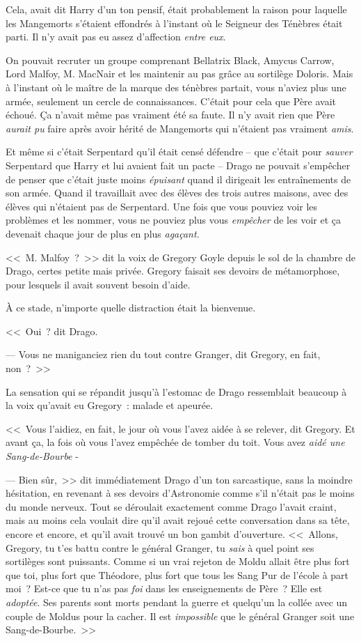 Cela, avait dit Harry d'un ton pensif, était probablement la raison pour laquelle les Mangemorts s'étaient effondrés à l'instant où le Seigneur des Ténèbres était parti. Il n'y avait pas eu assez d'affection \emph{entre eux}.

On pouvait recruter un groupe comprenant Bellatrix Black, Amycus Carrow, Lord Malfoy, M. MacNair et les maintenir au pas grâce au sortilège Doloris. Mais à l'instant où le maître de la marque des ténèbres partait, vous n'aviez plus une armée, seulement un cercle de connaissances. C'était pour cela que Père avait échoué. Ça n'avait même pas vraiment été sa faute. Il n'y avait rien que Père \emph{aurait pu} faire après avoir hérité de Mangemorts qui n'étaient pas vraiment \emph{amis}.

Et même si c'était Serpentard qu'il était censé défendre -- que c'était pour \emph{sauver} Serpentard que Harry et lui avaient fait un pacte -- Drago ne pouvait s'empêcher de penser que c'était juste moins \emph{épuisant} quand il dirigeait les entraînements de son armée. Quand il travaillait avec des élèves des trois autres maisons, avec des élèves qui n'étaient pas de Serpentard. Une fois que vous pouviez voir les problèmes et les nommer, vous ne pouviez plus vous \emph{empêcher} de les voir et ça devenait chaque jour de plus en plus \emph{agaçant}.

<<~M. Malfoy~?~>> dit la voix de Gregory Goyle depuis le sol de la chambre de Drago, certes petite mais privée. Gregory faisait ses devoirs de métamorphose, pour lesquels il avait souvent besoin d'aide.

À ce stade, n'importe quelle distraction était la bienvenue.

<<~Oui~? dit Drago.

--- Vous ne maniganciez rien du tout contre Granger, dit Gregory, en fait, non~?~>>

La sensation qui se répandit jusqu'à l'estomac de Drago ressemblait beaucoup à la voix qu'avait eu Gregory~: malade et apeurée.

<<~Vous l'aidiez, en fait, le jour où vous l'avez aidée à se relever, dit Gregory. Et avant ça, la fois où vous l'avez empêchée de tomber du toit. Vous avez \emph{aidé une Sang-de-Bourbe} -

--- Bien sûr,~>> dit immédiatement Drago d'un ton sarcastique, sans la moindre hésitation, en revenant à ses devoirs d'Astronomie comme s'il n'était pas le moins du monde nerveux. Tout se déroulait exactement comme Drago l'avait craint, mais au moins cela voulait dire qu'il avait rejoué cette conversation dans sa tête, encore et encore, et qu'il avait trouvé un bon gambit d'ouverture. <<~Allons, Gregory, tu t'es battu contre le général Granger, tu \emph{sais} à quel point ses sortilèges sont puissants. Comme si un vrai rejeton de Moldu allait être plus fort que toi, plus fort que Théodore, plus fort que tous les Sang Pur de l'école à part moi~? Est-ce que tu n'as pas \emph{foi} dans les enseignements de Père~? Elle est \emph{adoptée}. Ses parents sont morts pendant la guerre et quelqu'un la collée avec un couple de Moldus pour la cacher. Il est \emph{impossible} que le général Granger soit une Sang-de-Bourbe.~>>

